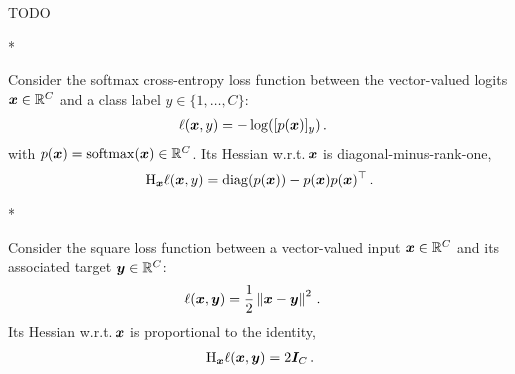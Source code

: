 \begin{definition}
  TODO
\end{definition}

\begin{definition}

\end{definition}

\begin{definition}

\end{definition}

\begin{definition}

\end{definition}

\begin{definition}

\end{definition}

\switchcolumn[1]*

\switchcolumn[0]
\begin{example}
  Consider the softmax cross-entropy loss function between the vector-valued logits ${\bm{x}} \in {\mathbb{R}}^C$ and a class label $y \in \{1, \dots, C\}$:
  \begin{align*}
    \ell({\bm{x}}, y)
    &=
      -\log([p({\bm{x}})]_y)\,.
  \end{align*}
  with $p({\bm{x}}) = \mathrm{softmax}({\bm{x}}) \in {\mathbb{R}}^C$.
  Its Hessian w.r.t.\,${\bm{x}}$ is diagonal-minus-rank-one,
  \begin{align*}
    \mathrm{H}_{{\bm{x}}} \ell({\bm{x}}, y)
    =
    \operatorname{diag}(p({\bm{x}})) - p({\bm{x}}) p({\bm{x}})^\top\,.
  \end{align*}
\end{example}

\switchcolumn[1]*

\switchcolumn[0]
\begin{example}
  Consider the square loss function between a vector-valued input ${\bm{x}} \in {\mathbb{R}}^C$ and its associated target ${\bm{y}} \in {\mathbb{R}}^C$:
  \begin{align*}
    \ell({\bm{x}}, {\bm{y}})
    &=
      \frac{1}{2}
      \left\lVert
      {\bm{x}} - {\bm{y}}
      \right\rVert^2\,.
  \end{align*}
  Its Hessian w.r.t.\,${\bm{x}}$ is proportional to the identity,
  \begin{align*}
    \mathrm{H}_{{\bm{x}}} \ell({\bm{x}}, {\bm{y}})
    =
    2 {\bm{I}}_C\,.
  \end{align*}
\end{example}

